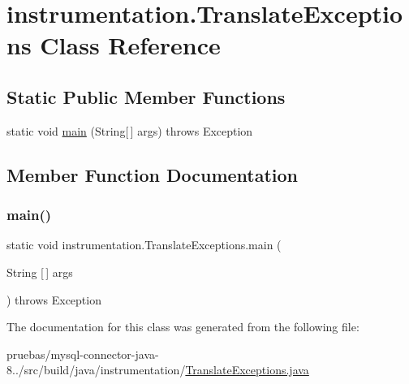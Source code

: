 \hypertarget{classinstrumentation_1_1_translate_exceptions}{}\section{instrumentation.\+Translate\+Exceptions Class Reference}
\label{classinstrumentation_1_1_translate_exceptions}
\subsection*{Static Public Member Functions}
\begin{DoxyCompactItemize}
\item 
static void \mbox{\hyperlink{classinstrumentation_1_1_translate_exceptions_aec586aa15e7b08000358fc1cb3de8d09}{main}} (String\mbox{[}$\,$\mbox{]} args)  throws Exception 
\end{DoxyCompactItemize}


\subsection{Member Function Documentation}
\mbox{\label{classinstrumentation_1_1_translate_exceptions_aec586aa15e7b08000358fc1cb3de8d09}} 
\subsubsection{\texorpdfstring{main()}{main()}}
{\footnotesize\ttfamily static void instrumentation.\+Translate\+Exceptions.\+main (\begin{DoxyParamCaption}\item[{String \mbox{[}$\,$\mbox{]}}]{args }\end{DoxyParamCaption}) throws Exception\hspace{0.3cm}{\ttfamily [static]}}



The documentation for this class was generated from the following file\+:\begin{DoxyCompactItemize}
\item 
pruebas/mysql-\/connector-\/java-\/8../src/build/java/instrumentation/\mbox{\hyperlink{_translate_exceptions_8java}{Translate\+Exceptions.\+java}}\end{DoxyCompactItemize}
